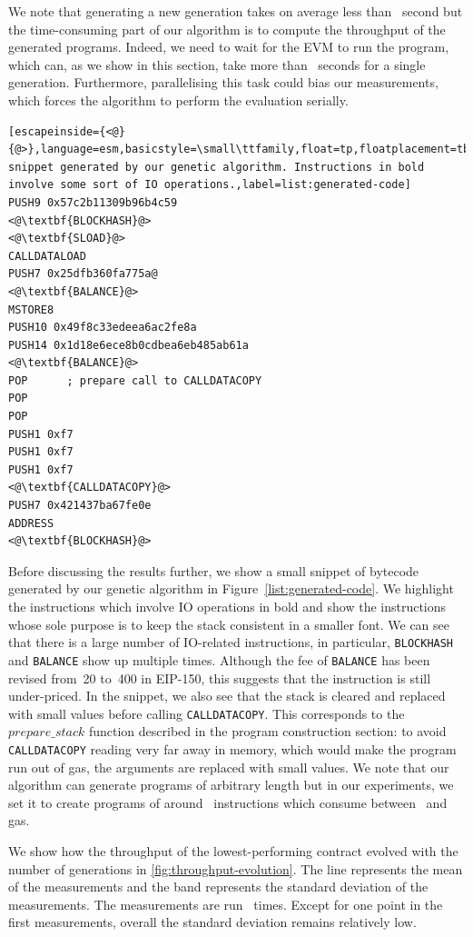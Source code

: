   We note that generating a new generation takes on average less than~ second but the time-consuming part of our algorithm is to compute the throughput of the generated programs. Indeed, we need to wait for the EVM to run the program, which can, as we show in this section, take more than~ seconds for a single generation. Furthermore, parallelising this task could bias our measurements, which forces the algorithm to perform the evaluation serially.

\begin{lstlisting}[escapeinside={<@}{@>},language=esm,basicstyle=\small\ttfamily,float=tp,floatplacement=tbp,caption=Bytecode snippet generated by our genetic algorithm. Instructions in bold involve some sort of IO operations.,label=list:generated-code]
PUSH9 0x57c2b11309b96b4c59
<@\textbf{BLOCKHASH}@>
<@\textbf{SLOAD}@>
CALLDATALOAD
PUSH7 0x25dfb360fa775a@
<@\textbf{BALANCE}@>
MSTORE8
PUSH10 0x49f8c33edeea6ac2fe8a
PUSH14 0x1d18e6ece8b0cdbea6eb485ab61a
<@\textbf{BALANCE}@>
POP      ; prepare call to CALLDATACOPY
POP
POP
PUSH1 0xf7
PUSH1 0xf7
PUSH1 0xf7
<@\textbf{CALLDATACOPY}@>
PUSH7 0x421437ba67fe0e
ADDRESS
<@\textbf{BLOCKHASH}@>
\end{lstlisting}

  Before discussing the results further, we show a small snippet of bytecode generated by our genetic algorithm in Figure~\ref{list:generated-code}. We highlight the instructions which involve IO operations in bold and show the instructions whose sole purpose is to keep the stack consistent in a smaller font. We can see that there is a large number of IO-related instructions, in particular, \lstinline{BLOCKHASH} and \lstinline{BALANCE} show up multiple times. Although the fee of \lstinline{BALANCE} has been revised from~20 to~400 in EIP-150, this suggests that the instruction is still under-priced. In the snippet, we also see that the stack is cleared and replaced with small values before calling \lstinline{CALLDATACOPY}. This corresponds to the $prepare\_stack$ function described in the program construction section: to avoid \lstinline{CALLDATACOPY} reading very far away in memory, which would make the program run out of gas, the arguments are replaced with small values. We note that our algorithm can generate programs of arbitrary length but in our experiments, we set it to create programs of around~ instructions which consume between~ and  gas.

  We show how the throughput of the lowest-performing contract evolved with the number of generations in \autoref{fig:throughput-evolution}. The line represents the mean of the measurements and the band represents the standard deviation of the measurements. The measurements are run~ times.
  Except for one point in the first measurements, overall the standard deviation remains relatively low.

